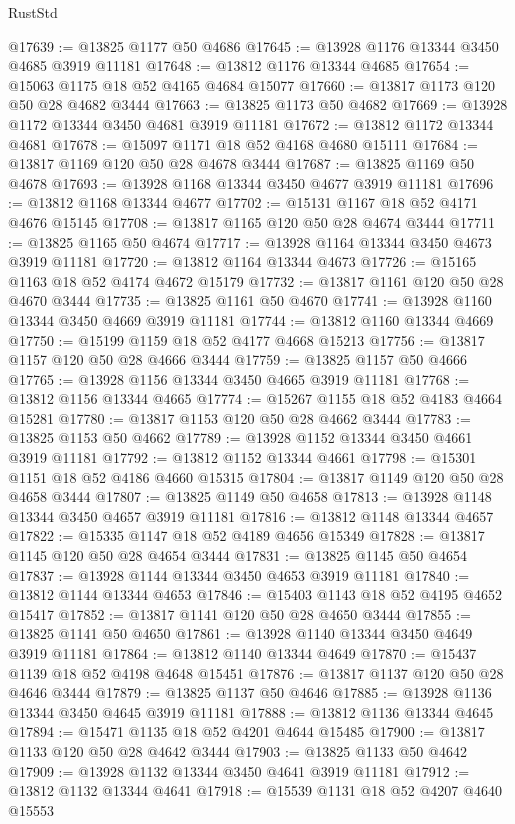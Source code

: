 \begin{lexlean}{RustStd}
\begin{coremodule}
@17639 := @13825 @1177 @50 @4686
@17645 := @13928 @1176 @13344 @3450 @4685 @3919 @11181
@17648 := @13812 @1176 @13344 @4685
@17654 := @15063 @1175 @18 @52 @4165 @4684 @15077
@17660 := @13817 @1173 @120 @50 @28 @4682 @3444
@17663 := @13825 @1173 @50 @4682
@17669 := @13928 @1172 @13344 @3450 @4681 @3919 @11181
@17672 := @13812 @1172 @13344 @4681
@17678 := @15097 @1171 @18 @52 @4168 @4680 @15111
@17684 := @13817 @1169 @120 @50 @28 @4678 @3444
@17687 := @13825 @1169 @50 @4678
@17693 := @13928 @1168 @13344 @3450 @4677 @3919 @11181
@17696 := @13812 @1168 @13344 @4677
@17702 := @15131 @1167 @18 @52 @4171 @4676 @15145
@17708 := @13817 @1165 @120 @50 @28 @4674 @3444
@17711 := @13825 @1165 @50 @4674
@17717 := @13928 @1164 @13344 @3450 @4673 @3919 @11181
@17720 := @13812 @1164 @13344 @4673
@17726 := @15165 @1163 @18 @52 @4174 @4672 @15179
@17732 := @13817 @1161 @120 @50 @28 @4670 @3444
@17735 := @13825 @1161 @50 @4670
@17741 := @13928 @1160 @13344 @3450 @4669 @3919 @11181
@17744 := @13812 @1160 @13344 @4669
@17750 := @15199 @1159 @18 @52 @4177 @4668 @15213
@17756 := @13817 @1157 @120 @50 @28 @4666 @3444
@17759 := @13825 @1157 @50 @4666
@17765 := @13928 @1156 @13344 @3450 @4665 @3919 @11181
@17768 := @13812 @1156 @13344 @4665
@17774 := @15267 @1155 @18 @52 @4183 @4664 @15281
@17780 := @13817 @1153 @120 @50 @28 @4662 @3444
@17783 := @13825 @1153 @50 @4662
@17789 := @13928 @1152 @13344 @3450 @4661 @3919 @11181
@17792 := @13812 @1152 @13344 @4661
@17798 := @15301 @1151 @18 @52 @4186 @4660 @15315
@17804 := @13817 @1149 @120 @50 @28 @4658 @3444
@17807 := @13825 @1149 @50 @4658
@17813 := @13928 @1148 @13344 @3450 @4657 @3919 @11181
@17816 := @13812 @1148 @13344 @4657
@17822 := @15335 @1147 @18 @52 @4189 @4656 @15349
@17828 := @13817 @1145 @120 @50 @28 @4654 @3444
@17831 := @13825 @1145 @50 @4654
@17837 := @13928 @1144 @13344 @3450 @4653 @3919 @11181
@17840 := @13812 @1144 @13344 @4653
@17846 := @15403 @1143 @18 @52 @4195 @4652 @15417
@17852 := @13817 @1141 @120 @50 @28 @4650 @3444
@17855 := @13825 @1141 @50 @4650
@17861 := @13928 @1140 @13344 @3450 @4649 @3919 @11181
@17864 := @13812 @1140 @13344 @4649
@17870 := @15437 @1139 @18 @52 @4198 @4648 @15451
@17876 := @13817 @1137 @120 @50 @28 @4646 @3444
@17879 := @13825 @1137 @50 @4646
@17885 := @13928 @1136 @13344 @3450 @4645 @3919 @11181
@17888 := @13812 @1136 @13344 @4645
@17894 := @15471 @1135 @18 @52 @4201 @4644 @15485
@17900 := @13817 @1133 @120 @50 @28 @4642 @3444
@17903 := @13825 @1133 @50 @4642
@17909 := @13928 @1132 @13344 @3450 @4641 @3919 @11181
@17912 := @13812 @1132 @13344 @4641
@17918 := @15539 @1131 @18 @52 @4207 @4640 @15553

\end{coremodule}
\end{lexlean}
